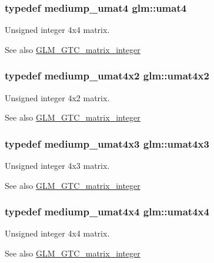 \subsubsection[{umat4}]{\setlength{\rightskip}{0pt plus 5cm}typedef mediump\+\_\+umat4 {\bf glm\+::umat4}}\label{group__gtc__matrix__integer_ga7ae562000d8a8d193e9f93cf51e2e113}
Unsigned integer 4x4 matrix. \begin{DoxySeeAlso}{See also}
\hyperlink{group__gtc__matrix__integer}{G\+L\+M\+\_\+\+G\+T\+C\+\_\+matrix\+\_\+integer} 
\end{DoxySeeAlso}
\hypertarget{group__gtc__matrix__integer_ga13e8392218e9b6e1b7f194a21b5c88bf}{}
\subsubsection[{umat4x2}]{\setlength{\rightskip}{0pt plus 5cm}typedef mediump\+\_\+umat4x2 {\bf glm\+::umat4x2}}\label{group__gtc__matrix__integer_ga13e8392218e9b6e1b7f194a21b5c88bf}
Unsigned integer 4x2 matrix. \begin{DoxySeeAlso}{See also}
\hyperlink{group__gtc__matrix__integer}{G\+L\+M\+\_\+\+G\+T\+C\+\_\+matrix\+\_\+integer} 
\end{DoxySeeAlso}
\hypertarget{group__gtc__matrix__integer_ga08373f5588a54da1a48e5e55c7d51004}{}
\subsubsection[{umat4x3}]{\setlength{\rightskip}{0pt plus 5cm}typedef mediump\+\_\+umat4x3 {\bf glm\+::umat4x3}}\label{group__gtc__matrix__integer_ga08373f5588a54da1a48e5e55c7d51004}
Unsigned integer 4x3 matrix. \begin{DoxySeeAlso}{See also}
\hyperlink{group__gtc__matrix__integer}{G\+L\+M\+\_\+\+G\+T\+C\+\_\+matrix\+\_\+integer} 
\end{DoxySeeAlso}
\hypertarget{group__gtc__matrix__integer_gae0931b79e808fb0983848778a60eb548}{}
\subsubsection[{umat4x4}]{\setlength{\rightskip}{0pt plus 5cm}typedef mediump\+\_\+umat4x4 {\bf glm\+::umat4x4}}\label{group__gtc__matrix__integer_gae0931b79e808fb0983848778a60eb548}
Unsigned integer 4x4 matrix. \begin{DoxySeeAlso}{See also}
\hyperlink{group__gtc__matrix__integer}{G\+L\+M\+\_\+\+G\+T\+C\+\_\+matrix\+\_\+integer} 
\end{DoxySeeAlso}
